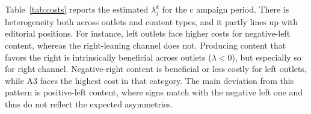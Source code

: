 \documentclass[12pt]{article}
\begin{document}
Table~\ref{tab:costs} reports the estimated $\lambda_j^k$ for the c ampaign period. There is heterogeneity both  across outlets and content types, and it partly lines up with editorial positions. For instance, left outlets face higher costs for negative-left content, whereas the right-leaning channel does not. Producing content that favors the right is intrinsically beneficial across outlets ($\lambda<0$), but especially so for right channel. Negative-right content is beneficial or less costly for left outlets, while A3 faces the highest cost in that category. The main deviation from this pattern is positive-left content, where signs match with the negative left one and thus do not reflect the expected asymmetries. 

\end{document}

